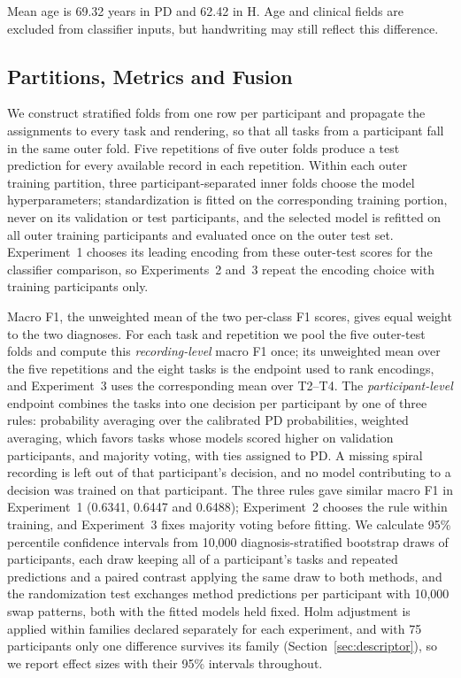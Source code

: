 Mean age is 69.32 years in PD and 62.42 in H. Age and clinical fields are excluded from classifier inputs, but handwriting may still reflect this difference.

\subsection{Partitions, Metrics and Fusion}
\label{sec:fusion}
\noindent
We construct stratified folds from one row per participant and propagate the assignments to every task and rendering, so that all tasks from a participant fall in the same outer fold. Five repetitions of five outer folds produce a test prediction for every available record in each repetition. Within each outer training partition, three participant-separated inner folds choose the model hyperparameters; standardization is fitted on the corresponding training portion, never on its validation or test participants, and the selected model is refitted on all outer training participants and evaluated once on the outer test set. Experiment~1 chooses its leading encoding from these outer-test scores for the classifier comparison, so Experiments~2 and~3 repeat the encoding choice with training participants only.

Macro F1, the unweighted mean of the two per-class F1 scores, gives equal weight to the two diagnoses. For each task and repetition we pool the five outer-test folds and compute this \emph{recording-level} macro F1 once; its unweighted mean over the five repetitions and the eight tasks is the endpoint used to rank encodings, and Experiment~3 uses the corresponding mean over T2--T4. The \emph{participant-level} endpoint combines the tasks into one decision per participant by one of three rules: probability averaging over the calibrated PD probabilities, weighted averaging, which favors tasks whose models scored higher on validation participants, and majority voting, with ties assigned to PD. A missing spiral recording is left out of that participant's decision, and no model contributing to a decision was trained on that participant. The three rules gave similar macro F1 in Experiment~1 (0.6341, 0.6447 and 0.6488); Experiment~2 chooses the rule within training, and Experiment~3 fixes majority voting before fitting.
We calculate 95\% percentile confidence intervals from 10,000 diagnosis-stratified bootstrap draws of participants, each draw keeping all of a participant's tasks and repeated predictions and a paired contrast applying the same draw to both methods, and the randomization test exchanges method predictions per participant with 10,000 swap patterns, both with the fitted models held fixed. Holm adjustment \cite{Holm1979} is applied within families declared separately for each experiment, and with 75 participants only one difference survives its family (Section~\ref{sec:descriptor}), so we report effect sizes with their 95\% intervals throughout.
